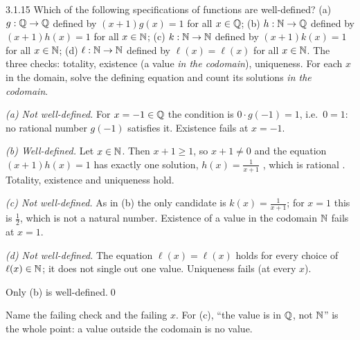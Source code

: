 \begin{bookex}[essential (a)--(c)]{3.1.15}
Which of the following specifications of functions are well-defined? (a) $g:\mathbb{Q}\to\mathbb{Q}$ defined by $(x+1)g(x)=1$ for all $x\in\mathbb{Q}$; (b) $h:\mathbb{N}\to\mathbb{Q}$ defined by $(x+1)h(x)=1$ for all $x\in\mathbb{N}$; (c) $k:\mathbb{N}\to\mathbb{N}$ defined by $(x+1)k(x)=1$ for all $x\in\mathbb{N}$; (d) $\ell:\mathbb{N}\to\mathbb{N}$ defined by $\ell(x)=\ell(x)$ for all $x\in\mathbb{N}$.
\solution
\given The three checks: totality, existence (a value \emph{in the codomain}), uniqueness.
\plan For each $x$ in the domain, solve the defining equation and count its solutions \emph{in the codomain}.
\begin{steps}
\item \emph{(a) Not well-defined.} For $x=-1\in\mathbb{Q}$ the condition is $0\cdot g(-1)=1$, i.e.\ $0=1$: no rational number $g(-1)$ satisfies it. Existence fails at $x=-1$.
\item \emph{(b) Well-defined.} Let $x\in\mathbb{N}$. Then $x+1\ge1$, so $x+1\ne0$ and the equation $(x+1)h(x)=1$ has exactly one solution, $h(x)=\frac1{x+1}$ , which is rational . Totality, existence and uniqueness hold.
\item \emph{(c) Not well-defined.} As in (b) the only candidate is $k(x)=\frac1{x+1}$; for $x=1$ this is $\frac12$, which is not a natural number. Existence of a value in the codomain $\mathbb{N}$ fails at $x=1$.
\item \emph{(d) Not well-defined.} The equation $\ell(x)=\ell(x)$ holds for every choice of $\ell(x)\in\mathbb{N}$; it does not single out one value. Uniqueness fails (at every $x$).
\end{steps}
\conclusion Only (b) is well-defined.\qed
\begin{compare}
\item Name the failing check and the failing $x$. For (c), ``the value is in $\mathbb{Q}$, not $\mathbb{N}$'' is the whole point: a value outside the codomain is no value.
\end{compare}
\end{bookex}

